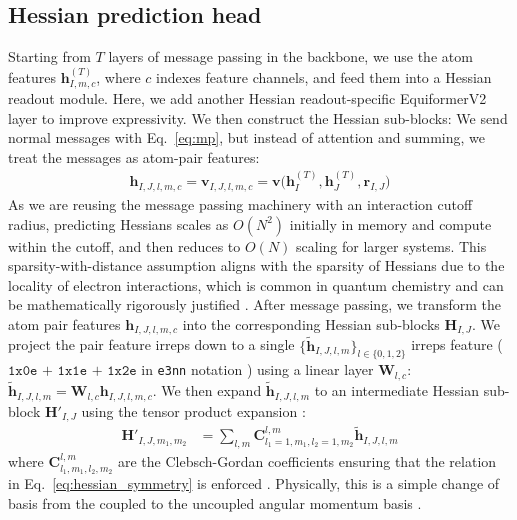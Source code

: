 \documentclass[pdflatex,sn-mathphys-num]{sn-jnl}%
\begin{document}
\subsection{Hessian prediction head}
Starting from $T$ layers of message passing in the backbone, we use the atom features $\mathbf{h}^{(T)}_{I,m,c}$, where $c$ indexes feature channels, and feed them into a Hessian readout module. Here, we add another Hessian readout-specific EquiformerV2 layer to improve expressivity. We then construct the Hessian sub-blocks: We send normal messages with Eq.~\eqref{eq:mp}, but instead of attention and summing, we treat the messages as atom-pair features:
\begin{align}
    \mathbf{h}_{I,J,l,m,c} 
    = \mathbf{v}_{I,J,l,m,c} 
    = \mathbf{v} \big(\mathbf{h}^{(T)}_I, \mathbf{h}^{(T)}_J, \mathbf{r}_{I,J} \big)
\end{align}
As we are reusing the message passing machinery with an interaction cutoff radius, predicting Hessians scales as $O(N^2)$ initially in memory and compute within the cutoff, and then reduces to $O(N)$ scaling for larger systems.
This sparsity-with-distance assumption aligns with the sparsity of Hessians due to the locality of electron interactions, which is common in quantum chemistry and can be mathematically rigorously justified \citep{kussmann2015reduced}.
After message passing, we transform the atom pair features $\mathbf{h}_{I,J,l,m,c}$ into the corresponding Hessian sub-blocks $\mathbf{H}_{I,J}$.
We project the pair feature irreps down to a single $\{\mathbf{\tilde{h}}_{I,J,l,m}\}_{l\in\{0,1,2\}}$ irreps feature ($\texttt{1x0e + 1x1e + 1x2e}$ in \texttt{e3nn} notation \citep{geiger2022e3nn}) using a linear layer $\mathbf{W}_{l,c}$:
$
\mathbf{\tilde{h}}_{I,J,l,m} = \mathbf{W}_{l,c}\mathbf{h}_{I,J,l,m,c}
$.
We then expand $\mathbf{\tilde{h}}_{I,J,l,m}$  to an intermediate Hessian sub-block $\mathbf{H}'_{I,J}$ using the tensor product expansion \citep{unke2021se}:
\begin{align}
\mathbf{H}'_{I,J,m_1,m_2} &= \sum_{l,m}\mathbf{C}^{l,m}_{l_1=1,m_1,l_2=1,m_2}\mathbf{\tilde{h}}_{I,J,l,m} \label{eq:tensor_expansion}
\end{align}
where $\mathbf{C}^{l,m}_{l_1,m_1,l_2,m_2}$ are the Clebsch-Gordan coefficients ensuring that the relation in Eq.~\eqref{eq:hessian_symmetry} is enforced \citep{unke2021se}. Physically, this is a simple change of basis from the coupled to the uncoupled angular momentum basis \citep{edmonds1996angular}.
\end{document}

